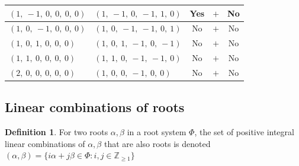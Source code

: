 \documentclass[11pt]{article}
\theoremstyle{definition}
\newtheorem{definition}{Definition}[section]
\begin{document}
\begin{center}
\begin{tabular}{|l|l|c|c|c|}
    \hline
    $\left( 1, \  -1, \  0, \  0, \  0, \  0\right)$ & $\left( 1, \  -1, \  0, \  -1, \  1, \  0\right)$ & Yes & $+$ & No \\
    \hline
    $\left( 1, \  0, \  -1, \  0, \  0, \  0\right)$ & $\left( 1, \  0, \  -1, \  -1, \  0, \  1\right)$ & No & $+$ & No \\
    \hline
    $\left( 1, \  0, \  1, \  0, \  0, \  0\right)$ & $\left( 1, \  0, \  1, \  -1, \  0, \  -1\right)$ & No & $+$ & No \\
    \hline
    $\left( 1, \  1, \  0, \  0, \  0, \  0\right)$ & $\left( 1, \  1, \  0, \  -1, \  -1, \  0\right)$ & No & $+$ & No \\
    \hline
    $\left( 2, \  0, \  0, \  0, \  0, \  0\right)$ & $\left( 1, \  0, \  0, \  -1, \  0, \  0\right)$ & No & $+$ & No \\
    \hline
\end{tabular}
\end{center}


\subsection{Linear combinations of roots}

\begin{definition}
For two roots $\alpha, \beta$ in a root system $\Phi$, the set of positive integral linear combinations of $\alpha, \beta$ that are also roots is denoted
\(
	(\alpha, \beta) = \{ i \alpha + j \beta \in \Phi : i, j \in \mathbb{Z}_{\ge 1} \}
\)
\end{definition}
\end{document}
